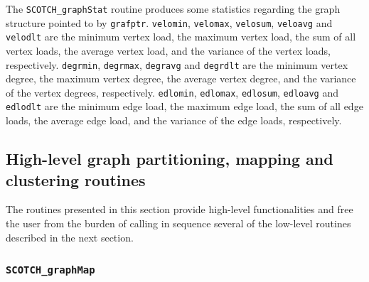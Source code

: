 \begin{itemize}
\progdes

The {\tt SCOTCH\_graphStat} routine produces some statistics regarding
the graph structure pointed to by {\tt grafptr}.
{\tt velomin}, {\tt velomax}, {\tt velosum}, {\tt veloavg} and
{\tt velodlt} are the minimum vertex load, the maximum vertex
load, the sum of all vertex loads, the average vertex load,
and the variance of the vertex loads, respectively.
{\tt degrmin}, {\tt degrmax}, {\tt degravg} and
{\tt degrdlt} are the minimum vertex degree, the maximum vertex
degree, the average vertex degree, and the variance of the vertex
degrees, respectively.
{\tt edlomin}, {\tt edlomax}, {\tt edlosum}, {\tt edloavg} and
{\tt edlodlt} are the minimum edge load, the maximum edge
load, the sum of all edge loads, the average edge load,
and the variance of the edge loads, respectively.
\end{itemize}

\subsection{High-level graph partitioning, mapping and clustering routines}
\label{sec-lib-func-part-map}

The routines presented in this section provide high-level
functionalities and free the user from the burden of calling in
sequence several of the low-level routines described in the next
section.

\subsubsection{{\tt SCOTCH\_graphMap}}
\label{sec-lib-func-graphmap}

